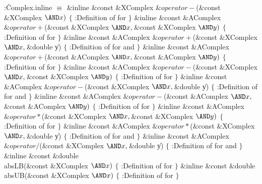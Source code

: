 \B{}:\.{Complex.inline }\X${}\equiv{}$\6
\&{inline} \&{const} \&{XComplex} ${}\&{operator}{-}{}$(\&{const} \&{XComplex}
${}{\AND}\|x){}$\1\1\2\2\6
${}\{{}$\1\6
:Definition of  for \X\6
\4${}\}{}$\2\7
\&{inline} \&{const} \&{AComplex} ${}\&{operator}{+}{}$(\&{const} \&{XComplex}
${}{\AND}\|x,\39{}$\&{const} \&{XComplex} ${}{\AND}\|y){}$\1\1\2\2\6
${}\{{}$\1\6
:Definition of  for \X\6
\4${}\}{}$\2\7
\&{inline} \&{const} \&{AComplex} ${}\&{operator}{+}{}$(\&{const} \&{XComplex}
${}{\AND}\|x,\39{}$\&{double} \|y)\1\1\2\2\6
${}\{{}$\1\6
:Definition of  for  and \X\6
\4${}\}{}$\2\7
\&{inline} \&{const} \&{AComplex} ${}\&{operator}{+}{}$(\&{const} \&{AComplex}
${}{\AND}\|x,\39{}$\&{const} \&{AComplex} ${}{\AND}\|y){}$\1\1\2\2\6
${}\{{}$\1\6
:Definition of  for \X\6
\4${}\}{}$\2\7
\&{inline} \&{const} \&{AComplex} ${}\&{operator}{-}{}$(\&{const} \&{XComplex}
${}{\AND}\|x,\39{}$\&{const} \&{XComplex} ${}{\AND}\|y){}$\1\1\2\2\6
${}\{{}$\1\6
:Definition of  for \X\6
\4${}\}{}$\2\7
\&{inline} \&{const} \&{AComplex} ${}\&{operator}{-}{}$(\&{const} \&{XComplex}
${}{\AND}\|x,\39{}$\&{double} \|y)\1\1\2\2\6
${}\{{}$\1\6
:Definition of  for  and \X\6
\4${}\}{}$\2\7
\&{inline} \&{const} \&{AComplex} ${}\&{operator}{-}{}$(\&{const} \&{AComplex}
${}{\AND}\|x,\39{}$\&{const} \&{AComplex} ${}{\AND}\|y){}$\1\1\2\2\6
${}\{{}$\1\6
:Definition of  for \X\6
\4${}\}{}$\2\7
\&{inline} \&{const} \&{AComplex} ${}\&{operator}*{}$(\&{const} \&{XComplex}
${}{\AND}\|x,\39{}$\&{const} \&{XComplex} ${}{\AND}\|y){}$\1\1\2\2\6
${}\{{}$\1\6
:Definition of  for \X\6
\4${}\}{}$\2\7
\&{inline} \&{const} \&{AComplex} ${}\&{operator}*{}$(\&{const} \&{XComplex}
${}{\AND}\|x,\39{}$\&{double} \|y)\1\1\2\2\6
${}\{{}$\1\6
:Definition of  for  and \X\6
\4${}\}{}$\2\7
\&{inline} \&{const} \&{AComplex} ${}\&{operator}{/}{}$(\&{const} \&{XComplex}
${}{\AND}\|x,\39{}$\&{double} \|y)\1\1\2\2\6
${}\{{}$\1\6
:Definition of  for  and \X\6
\4${}\}{}$\2\7
\&{inline} \&{const} \&{double} \\{absLB}(\&{const} \&{XComplex} ${}{\AND}%
\|x){}$\1\1\2\2\6
${}\{{}$\1\6
:Definition of  for \X\6
\4${}\}{}$\2\7
\&{inline} \&{const} \&{double} \\{absUB}(\&{const} \&{XComplex} ${}{\AND}%
\|x){}$\1\1\2\2\6
${}\{{}$\1\6
:Definition of  for \X\6
\4${}\}{}$\2\par
\fi


